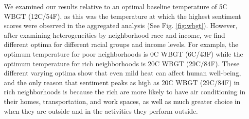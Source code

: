 
We examined our results relative to an optimal baseline temperature of 5\textdegree C WBGT (12\textdegree C/54\textdegree F), as this was the temperature at which the highest sentiment scores were observed in the aggregated analysis (See Fig. \ref{fig:wbgt}).  However, after examining heterogeneities by neighborhood race and income, we find different optima for different racial groups and income levels.  For example, the optimum temperature for poor neighborhoods is 0\textdegree C WBGT (6\textdegree C/43\textdegree F) while the optimum temperature for rich neighborhoods is 20\textdegree C WBGT (29\textdegree C/84\textdegree F).  These different varying optima show that even mild heat can affect human well-being, and the only reason that sentiment peaks as high as 20\textdegree C WBGT (29\textdegree C/84\textdegree F) in rich neighborhoods is because the rich are more likely to have air conditioning in their homes, transportation, and work spaces, as well as much greater choice in when they are outside and in the activities they perform outside.
